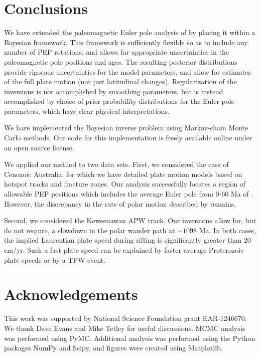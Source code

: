 \documentclass[preprint,12pt,authoryear]{elsarticle}
\begin{document}
\section{Conclusions}
\label{sec:conclusions}

We have extended the paleomagnetic Euler pole analysis of 
\citet{gordon1984paleomagnetic} by placing it within a Bayesian framework. 
This framework is sufficiently flexible so as to include any number of PEP rotations,
and allows for appropriate uncertainties in the paleomagnetic pole positions and ages.
The resulting posterior distributions provide rigorous uncertainties for the model parameters,
and allow for estimates of the full plate motion (not just latitudinal changes).
Regularization of the inversions is not accomplished by smoothing parameters,
but is instead accomplished by choice of prior probability distributions for the Euler pole parameters,
which have clear physical interpretations.

We have implemented the Bayesian inverse problem using Markov-chain
Monte Carlo methods. Our code for this implementation is freely available online under an open source license.

We applied our method to two data sets. First, we considered the case of Cenozoic Australia,
for which we have detailed plate motion models based on hotspot tracks and fracture zones.
Our analysis successfully locates a region of allowable PEP positions which includes
the average Euler pole from 0-60 Ma of \citet{seton2012global}.
However, the discrepancy in the rate of polar motion described by \citet{idnurm1985lateII} remains.

Second, we considered the Keweenawan APW track.
Our inversions allow for, but do not require, a slowdown in the polar wander path at $\sim1098$ Ma.
In both cases, the implied Laurentian plate speed during rifting is significantly greater than 20 cm/yr.
Such a fast plate speed can be explained by faster average Proterozoic plate speeds or by a TPW event.

\section*{Acknowledgements}
\label{sec:acknowledgements}
This work was supported by National Science Foundation grant EAR-1246670. 
We thank Dave Evans and Mike Tetley for useful discussions.
MCMC analysis was performed using PyMC.
Additional analysis was performed using the Python packages NumPy and Scipy, and figures were created using Matplotlib.
\end{document}
